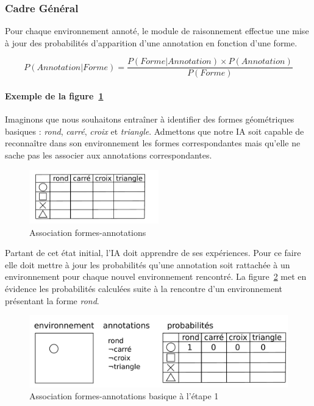 \subsubsection{Cadre Général}

Pour chaque environnement annoté, le module de raisonnement effectue une mise à jour des probabilités d'apparition d'une annotation en fonction d'une forme.

\[ P(Annotation|Forme) = \frac{P(Forme|Annotation) \times P(Annotation)}{P(Forme)} \]

\paragraph{Exemple de la figure~\ref{img_annotations}}
Imaginons que nous souhaitons entraîner \cogito{} à identifier des formes géométriques basiques : \emph{rond}, \emph{carré}, \emph{croix} et \emph{triangle}. Admettons que notre IA soit capable de reconnaître dans son environnement les formes correspondantes mais qu'elle ne sache pas les associer aux annotations correspondantes.

\begin{figure}[H] 
\centering
    \includegraphics[width=0.5\textwidth]{files/raisonneur/annotations} 
\caption{Association formes-annotations} 
\label{img_annotations}
\end{figure}

Partant de cet état initial, l'IA doit apprendre de ses expériences. Pour ce faire elle doit mettre à jour les probabilités qu'une annotation soit rattachée à un environnement pour chaque nouvel environnement rencontré. La figure~\ref{img_annotations_1} met en évidence les probabilités calculées suite à la rencontre d'un environnement présentant la forme \emph{rond}.

\begin{figure}[H] 
\centering
\includegraphics[width=\textwidth]{files/raisonneur/annotations_1} 
\caption{Association formes-annotations basique à l'étape 1} 
\label{img_annotations_1}
\end{figure}

